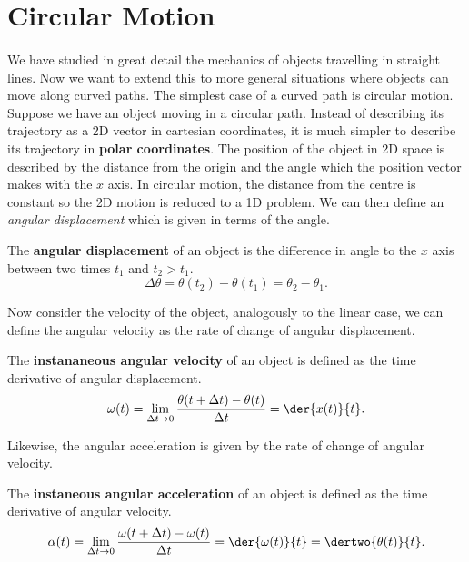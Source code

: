 \documentclass[../newtonian_mechanics.tex]{subfiles}
\begin{document}
    \section{Circular Motion}
        \paragraph{}
        We have studied in great detail the mechanics of objects travelling in straight lines.
        Now we want to extend this to more general situations where objects can move along curved paths.
        The simplest case of a curved path is circular motion.
        Suppose we have an object moving in a circular path.
        Instead of describing its trajectory as a 2D vector in cartesian coordinates, it is much simpler to describe its trajectory in \textbf{polar coordinates}.
        The position of the object in 2D space is described by the distance from the origin and the angle which the position vector makes with the $x$ axis.
        In circular motion, the distance from the centre is constant so the 2D motion is reduced to a 1D problem.
        We can then define an \textit{angular displacement} which is given in terms of the angle.
        \begin{definition}
            The \textbf{angular displacement} of an object is the difference in angle to the $x$ axis between two times $t_1$ and $t_2>t_1$.
            \begin{equation}
                \Delta\theta=\theta(t_2)-\theta(t_1)=\theta_2-\theta_1.
            \end{equation}
        \end{definition}
        Now consider the velocity of the object, analogously to the linear case, we can define the angular velocity as the rate of change of angular displacement.
        \begin{definition}
            The \textbf{instananeous angular velocity} of an object is defined as the time derivative of angular displacement.
            \begin{equation}
                \omega(t)=\lim_{\Delta t\to0}\frac{\theta(t+\Delta t)-\theta(t)}{\Delta t}=\der{x(t)}{t}.
            \end{equation}
        \end{definition}
        Likewise, the angular acceleration is given by the rate of change of angular velocity.
        \begin{definition}
            The \textbf{instaneous angular acceleration} of an object is defined as the time derivative of angular velocity.
            \begin{equation}
                \alpha(t)=\lim_{\Delta t\to0}\frac{\omega(t+\Delta t)-\omega(t)}{\Delta t}=\der{\omega(t)}{t}=\dertwo{\theta(t)}{t}.
            \end{equation}
        \end{definition}
\end{document}
